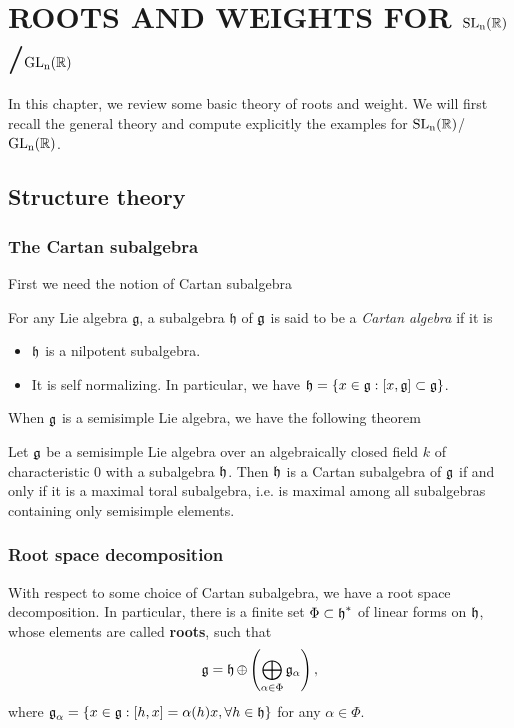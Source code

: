 

\chapter{ROOTS AND WEIGHTS FOR $\operatorname{\text{SL}_n(\mathbb{R})}$/$\operatorname{\text{GL}_n(\mathbb{R})}$}
In this chapter, we review some basic theory of roots and weight. We will first recall the
general theory and compute explicitly the examples for $\operatorname{\text{SL}_n(\mathbb{R})}$/$\operatorname{\text{GL}_n(\mathbb{R})}$.
\section{Structure theory}
\subsection{The Cartan subalgebra}
First we need the notion of Cartan subalgebra
\begin{definition}
    For any Lie algebra $\mathfrak{g}$, a subalgebra $\mathfrak{h}$ of $\operatorname{\mathfrak{g}}$ is said to be a \textit{Cartan algebra} if it is
    \begin{itemize}
        \item $\operatorname{\mathfrak{h}}$ is a nilpotent subalgebra.
        \item It is self normalizing. In particular, we have $\operatorname{\mathfrak{h}} = \left\lbrace x \in \operatorname{\mathfrak{g}} : [x,\operatorname{\mathfrak{g}}] \subset \operatorname{\mathfrak{g}}\right\rbrace$.
    \end{itemize}
\end{definition}
When $\operatorname{\mathfrak{g}}$ is a semisimple Lie algebra, we have the following theorem
\begin{theorem}
    Let $\operatorname{\mathfrak{g}}$ be a semisimple Lie algebra over an algebraically closed field $k$ of characteristic $0$ with a subalgebra $\operatorname{\mathfrak{h}}$.
    Then $\operatorname{\mathfrak{h}}$ is a Cartan subalgebra of $\operatorname{\mathfrak{g}}$ if and only if it is a maximal toral subalgebra, i.e. is maximal among all subalgebras
    containing only semisimple elements.
\end{theorem}
\subsection{Root space decomposition}
With respect to some choice of Cartan subalgebra, we have a root space decomposition. In particular, there is a finite set
$\Phi \subset \operatorname{\mathfrak{h}}^{*}$ of linear forms on $\operatorname{\mathfrak{h}}$, whose elements are called \textbf{roots}, such that
\[\operatorname{\mathfrak{g}} = \operatorname{\mathfrak{h}} \oplus \left(\bigoplus_{\alpha \in \Phi} \mathfrak{g}_\alpha\right),\]
where $\operatorname{\mathfrak{g}}_\alpha = \left\lbrace x \in \operatorname{\mathfrak{g}}: [h,x] = \alpha(h)x, \forall h \in \operatorname{\mathfrak{h}}\right\rbrace$ for any $\alpha \in \Phi$.
